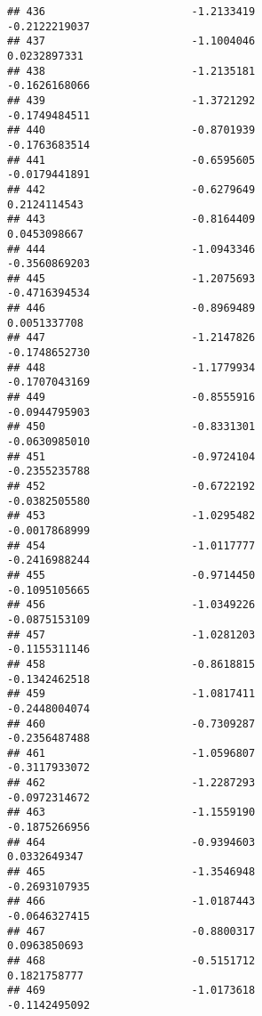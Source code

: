 \documentclass[
]{article}
\begin{document}
\begin{verbatim}
## 436                       -1.2133419                         -0.2122219037
## 437                       -1.1004046                          0.0232897331
## 438                       -1.2135181                         -0.1626168066
## 439                       -1.3721292                         -0.1749484511
## 440                       -0.8701939                         -0.1763683514
## 441                       -0.6595605                         -0.0179441891
## 442                       -0.6279649                          0.2124114543
## 443                       -0.8164409                          0.0453098667
## 444                       -1.0943346                         -0.3560869203
## 445                       -1.2075693                         -0.4716394534
## 446                       -0.8969489                          0.0051337708
## 447                       -1.2147826                         -0.1748652730
## 448                       -1.1779934                         -0.1707043169
## 449                       -0.8555916                         -0.0944795903
## 450                       -0.8331301                         -0.0630985010
## 451                       -0.9724104                         -0.2355235788
## 452                       -0.6722192                         -0.0382505580
## 453                       -1.0295482                         -0.0017868999
## 454                       -1.0117777                         -0.2416988244
## 455                       -0.9714450                         -0.1095105665
## 456                       -1.0349226                         -0.0875153109
## 457                       -1.0281203                         -0.1155311146
## 458                       -0.8618815                         -0.1342462518
## 459                       -1.0817411                         -0.2448004074
## 460                       -0.7309287                         -0.2356487488
## 461                       -1.0596807                         -0.3117933072
## 462                       -1.2287293                         -0.0972314672
## 463                       -1.1559190                         -0.1875266956
## 464                       -0.9394603                          0.0332649347
## 465                       -1.3546948                         -0.2693107935
## 466                       -1.0187443                         -0.0646327415
## 467                       -0.8800317                          0.0963850693
## 468                       -0.5151712                          0.1821758777
## 469                       -1.0173618                         -0.1142495092

\end{verbatim}
\end{document}

